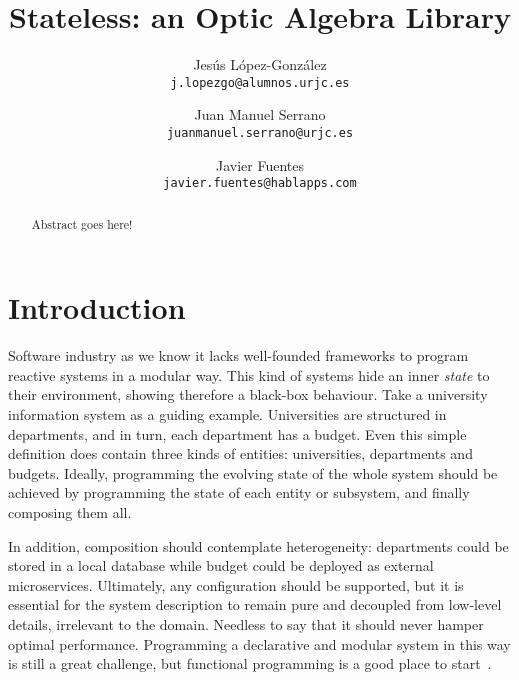 \documentclass[a4paper]{article}
\begin{document}
\lstset{language=Scala}

\title{Stateless: an Optic Algebra Library}
\author{
  Jesús López-González\\
  \texttt{j.lopezgo@alumnos.urjc.es}
  \and
  Juan Manuel Serrano\\
  \texttt{juanmanuel.serrano@urjc.es}
  \and
  Javier Fuentes\\
  \texttt{javier.fuentes@hablapps.com}
}

\maketitle

\begin{abstract}

  Abstract goes here!

\end{abstract}

\section{Introduction}


Software industry as we know it lacks
well-founded frameworks to program reactive systems in a modular way. This kind
of systems hide an inner \emph{state} to their environment, showing therefore a
black-box behaviour. Take a university information system as a guiding example.
Universities are structured in departments, and in turn, each department has a
budget. Even this simple definition does contain three kinds of entities:
universities, departments and budgets. Ideally, programming the evolving state
of the whole system should be achieved by programming the state of each entity
or subsystem, and finally composing them all.

In addition, composition should contemplate heterogeneity: departments could be
stored in a local database while budget could be deployed as external
microservices. Ultimately, any configuration should be supported, but it is
essential for the system description to remain pure and decoupled from low-level
details, irrelevant to the domain. Needless to say that it should never hamper
optimal performance. Programming a declarative and modular system in this way is
still a great challenge, but functional programming is a good place to
start~\cite{hughes1989functional}.

\end{document}
